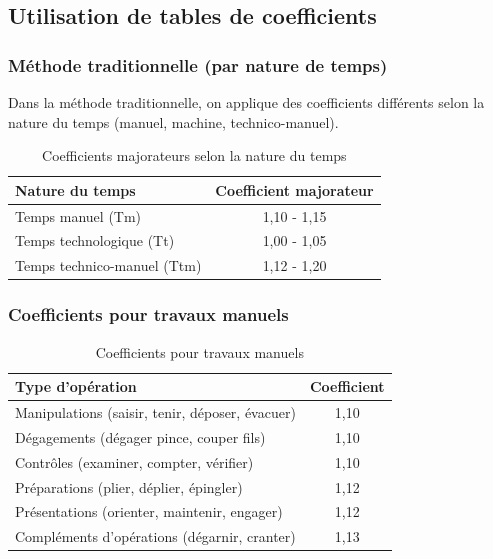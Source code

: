 \documentclass[a4paper,12pt]{article}
\begin{document}
\subsection{Utilisation de tables de coefficients}

\subsubsection{Méthode traditionnelle (par nature de temps)}

Dans la méthode traditionnelle, on applique des coefficients différents selon la nature du temps (manuel, machine, technico-manuel).

\begin{table}[ht]
\centering
\begin{tabular}{|l|c|}
\hline
\textbf{Nature du temps} & \textbf{Coefficient majorateur} \\
\hline
Temps manuel (Tm) & 1,10 - 1,15 \\
Temps technologique (Tt) & 1,00 - 1,05 \\
Temps technico-manuel (Ttm) & 1,12 - 1,20 \\
\hline
\end{tabular}
\caption{Coefficients majorateurs selon la nature du temps}
\end{table}

\subsubsection{Coefficients pour travaux manuels}

\begin{table}[ht]
\centering
\begin{tabular}{|l|c|}
\hline
\textbf{Type d'opération} & \textbf{Coefficient} \\
\hline
Manipulations (saisir, tenir, déposer, évacuer) & 1,10 \\
Dégagements (dégager pince, couper fils) & 1,10 \\
Contrôles (examiner, compter, vérifier) & 1,10 \\
Préparations (plier, déplier, épingler) & 1,12 \\
Présentations (orienter, maintenir, engager) & 1,12 \\
Compléments d'opérations (dégarnir, cranter) & 1,13 \\
\hline
\end{tabular}
\caption{Coefficients pour travaux manuels}
\end{table}
\end{document}

